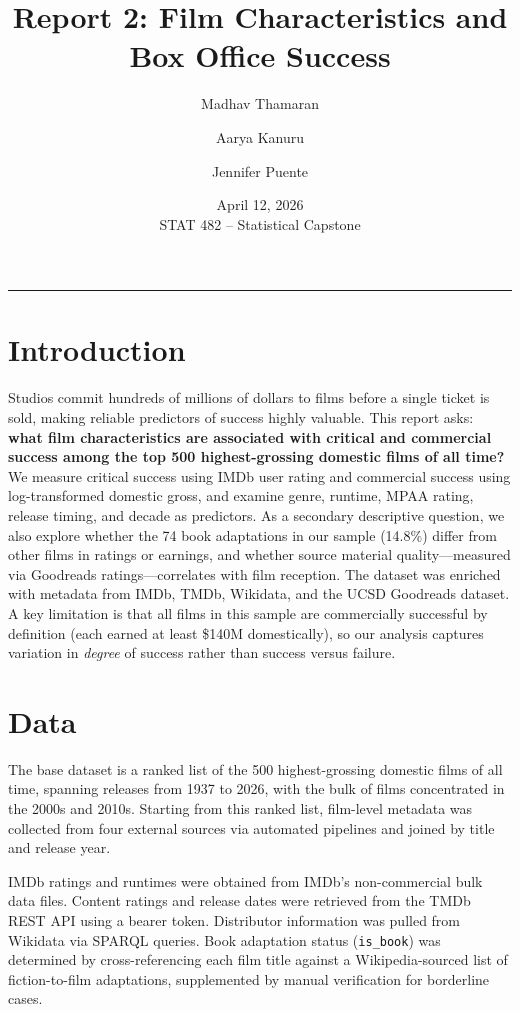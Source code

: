 \documentclass[11pt]{article}
\title{\textbf{Report 2: Film Characteristics and Box Office Success}}
\author{
  Madhav Thamaran \and Aarya Kanuru \and Jennifer Puente
}
\date{April 12, 2026 \\ \small STAT 482 -- Statistical Capstone}
\begin{document}
\maketitle

\hrule
\vspace{1em}

\section{Introduction}

Studios commit hundreds of millions of dollars to films before a single ticket is sold, making reliable predictors of success highly valuable. This report asks: \textbf{what film characteristics are associated with critical and commercial success among the top 500 highest-grossing domestic films of all time?} We measure critical success using IMDb user rating and commercial success using log-transformed domestic gross, and examine genre, runtime, MPAA rating, release timing, and decade as predictors. As a secondary descriptive question, we also explore whether the 74 book adaptations in our sample (14.8\%) differ from other films in ratings or earnings, and whether source material quality---measured via Goodreads ratings---correlates with film reception. The dataset was enriched with metadata from IMDb, TMDb, Wikidata, and the UCSD Goodreads dataset. A key limitation is that all films in this sample are commercially successful by definition (each earned at least \$140M domestically), so our analysis captures variation in \textit{degree} of success rather than success versus failure.

\section{Data}

The base dataset is a ranked list of the 500 highest-grossing domestic films of all time, spanning releases from 1937 to 2026, with the bulk of films concentrated in the 2000s and 2010s. Starting from this ranked list, film-level metadata was collected from four external sources via automated pipelines and joined by title and release year.

IMDb ratings and runtimes were obtained from IMDb's non-commercial bulk data files. Content ratings and release dates were retrieved from the TMDb REST API using a bearer token. Distributor information was pulled from Wikidata via SPARQL queries. Book adaptation status (\texttt{is\_book}) was determined by cross-referencing each film title against a Wikipedia-sourced list of fiction-to-film adaptations, supplemented by manual verification for borderline cases.
\end{document}
